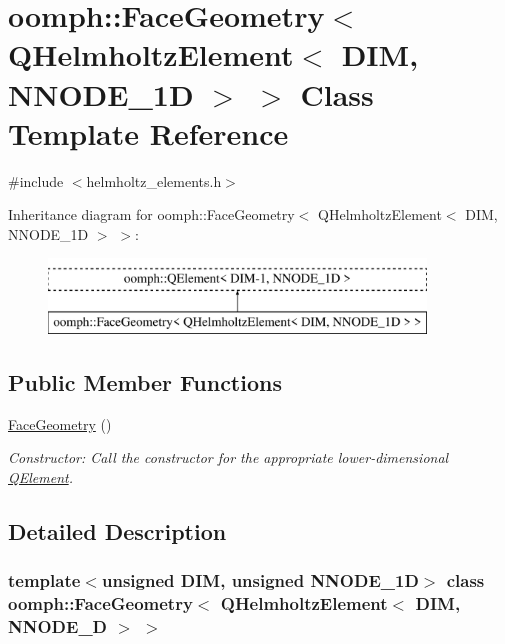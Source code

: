 \hypertarget{classoomph_1_1FaceGeometry_3_01QHelmholtzElement_3_01DIM_00_01NNODE__1D_01_4_01_4}{}\section{oomph\+:\+:Face\+Geometry$<$ Q\+Helmholtz\+Element$<$ D\+IM, N\+N\+O\+D\+E\+\_\+1D $>$ $>$ Class Template Reference}
\label{classoomph_1_1FaceGeometry_3_01QHelmholtzElement_3_01DIM_00_01NNODE__1D_01_4_01_4}


{\ttfamily \#include $<$helmholtz\+\_\+elements.\+h$>$}

Inheritance diagram for oomph\+:\+:Face\+Geometry$<$ Q\+Helmholtz\+Element$<$ D\+IM, N\+N\+O\+D\+E\+\_\+1D $>$ $>$\+:\begin{figure}[H]
\begin{center}
\leavevmode
\includegraphics[height=2.000000cm]{classoomph_1_1FaceGeometry_3_01QHelmholtzElement_3_01DIM_00_01NNODE__1D_01_4_01_4}
\end{center}
\end{figure}
\subsection*{Public Member Functions}
\begin{DoxyCompactItemize}
\item 
\hyperlink{classoomph_1_1FaceGeometry_3_01QHelmholtzElement_3_01DIM_00_01NNODE__1D_01_4_01_4_a940ed4939121cb42c0f2a8ab839ab10a}{Face\+Geometry} ()
\begin{DoxyCompactList}\small\item\em Constructor\+: Call the constructor for the appropriate lower-\/dimensional \hyperlink{classoomph_1_1QElement}{Q\+Element}. \end{DoxyCompactList}\end{DoxyCompactItemize}


\subsection{Detailed Description}
\subsubsection*{template$<$unsigned D\+IM, unsigned N\+N\+O\+D\+E\+\_\+1D$>$\newline
class oomph\+::\+Face\+Geometry$<$ Q\+Helmholtz\+Element$<$ D\+I\+M, N\+N\+O\+D\+E\+\_\+D $>$ $>$}

